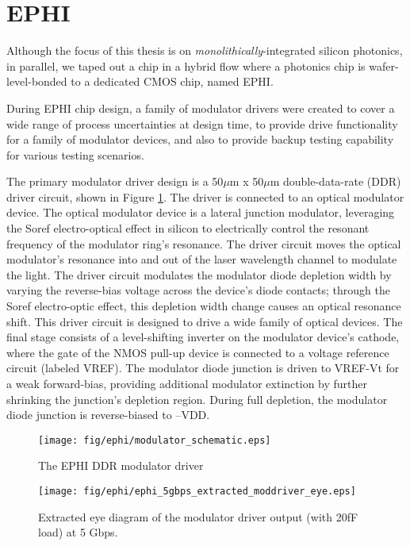 \section{EPHI}

Although the focus of this thesis is on \emph{monolithically}-integrated silicon photonics, in parallel, we taped out a chip in a hybrid flow where a photonics chip is wafer-level-bonded to a dedicated CMOS chip, named EPHI.

During EPHI chip design, a family of modulator drivers were created to cover a wide range of process uncertainties at design time, to provide drive functionality for a family of modulator devices, and also to provide backup testing capability for various testing scenarios.

The primary modulator driver design is a 50$\mu$m x 50$\mu$m double-data-rate (DDR) driver circuit, shown in Figure \ref{fig:ephi_modulator_schematic}.  The driver is connected to an optical modulator device.  The optical modulator device is a lateral junction modulator, leveraging the Soref electro-optical effect in silicon to electrically control the resonant frequency of the modulator ring’s resonance.   The driver circuit moves the optical modulator’s resonance into and out of the laser wavelength channel to modulate the light.  The driver circuit modulates the modulator diode depletion width by varying the reverse-bias voltage across the device’s diode contacts; through the Soref electro-optic effect, this depletion width change causes an optical resonance shift.  This driver circuit is designed to drive a wide family of optical devices. The final stage consists of a level-shifting inverter on the modulator device’s cathode, where the gate of the NMOS pull-up device is connected to a voltage reference circuit (labeled VREF).   The modulator diode junction is driven to VREF-Vt for a weak forward-bias, providing additional modulator extinction by further shrinking the junction’s depletion region.  During full depletion, the modulator diode junction is reverse-biased to –VDD.  


	\begin{figure}[ht]
		\begin{center}
			\texttt{[image: fig/ephi/modulator\_schematic.eps]}
			\caption{\label{fig:ephi_modulator_schematic}The EPHI DDR modulator driver}
		\end{center}
	\end{figure}



	\begin{figure}[ht]
		\begin{center}
			\texttt{[image: fig/ephi/ephi\_5gbps\_extracted\_moddriver\_eye.eps]}
			\caption{\label{fig:ephi_5gbps_extracted_moddriver_eye}Extracted eye diagram of the modulator driver output (with 20fF load) at 5 Gbps.}
		\end{center}
	\end{figure}
 

